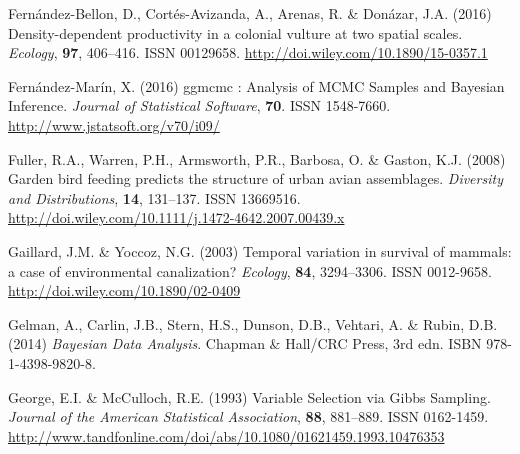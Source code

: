 \documentclass[12pt]{article}
\begin{document}
\begin{thebibliography}{87}
	Fern{\'{a}}ndez-Bellon, D., Cort{\'{e}}s-Avizanda, A., Arenas, R. \&
	Don{\'{a}}zar, J.A. (2016) {Density-dependent productivity in a colonial
		vulture at two spatial scales}.
	\newblock \emph{Ecology}, \textbf{97}, 406--416.
	\newblock ISSN 00129658.
	\newline\urlprefix\url{http://doi.wiley.com/10.1890/15-0357.1}
	
	Fern{\'{a}}ndez-Mar{\'{i}}n, X. (2016) {ggmcmc : Analysis of MCMC Samples and
		Bayesian Inference}.
	\newblock \emph{Journal of Statistical Software}, \textbf{70}.
	\newblock ISSN 1548-7660.
	\newline\urlprefix\url{http://www.jstatsoft.org/v70/i09/}
	
	Fuller, R.A., Warren, P.H., Armsworth, P.R., Barbosa, O. \& Gaston, K.J. (2008)
	{Garden bird feeding predicts the structure of urban avian assemblages}.
	\newblock \emph{Diversity and Distributions}, \textbf{14}, 131--137.
	\newblock ISSN 13669516.
	\newline\urlprefix\url{http://doi.wiley.com/10.1111/j.1472-4642.2007.00439.x}
	
	Gaillard, J.M. \& Yoccoz, N.G. (2003) {Temporal variation in survival of
		mammals: a case of environmental canalization?}
	\newblock \emph{Ecology}, \textbf{84}, 3294--3306.
	\newblock ISSN 0012-9658.
	\newline\urlprefix\url{http://doi.wiley.com/10.1890/02-0409}
	
	Gelman, A., Carlin, J.B., Stern, H.S., Dunson, D.B., Vehtari, A. \& Rubin, D.B.
	(2014) \emph{{Bayesian Data Analysis}}.
	\newblock Chapman {\&} Hall/CRC Press, 3rd edn.
	\newblock ISBN 978-1-4398-9820-8.
	
	George, E.I. \& McCulloch, R.E. (1993) {Variable Selection via Gibbs Sampling}.
	\newblock \emph{Journal of the American Statistical Association}, \textbf{88},
	881--889.
	\newblock ISSN 0162-1459.
	\newline\urlprefix\url{http://www.tandfonline.com/doi/abs/10.1080/01621459.1993.10476353}
	

\end{thebibliography}
\end{document}
